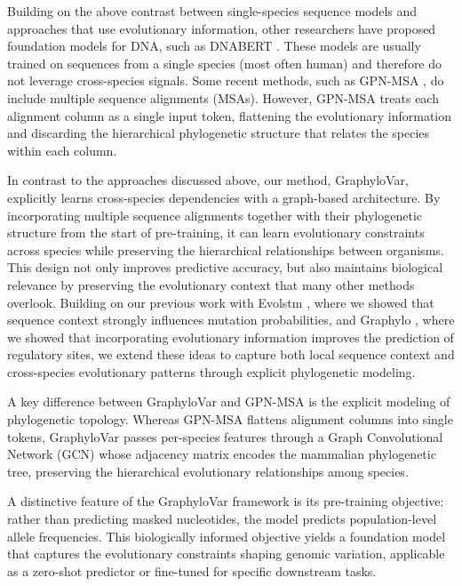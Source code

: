 \documentclass[unnumsec,webpdf,contemporary,large]{oup-authoring-template}%
\newcommand{\rev}[1]{{\color{red}#1}}
\theoremstyle{thmstyleone}%
\theoremstyle{thmstyletwo}%
\theoremstyle{thmstylethree}%
\begin{document}
Building on the above contrast between single-species sequence models and approaches that use evolutionary information, other researchers have proposed foundation models for DNA, such as DNABERT \citep{ji2021dnabert}. These models are usually trained on sequences from a single species (most often human) and therefore do not leverage cross-species signals. Some recent methods, such as \rev{GPN-MSA \citep{benegas2024gpnmsa}, do include multiple sequence alignments (MSAs). However, GPN-MSA treats each alignment column as a single input token, flattening the evolutionary information and discarding the hierarchical phylogenetic structure that relates the species within each column.}

In contrast to the approaches discussed above, our method, GraphyloVar, explicitly learns cross-species dependencies with a graph-based architecture. By incorporating multiple sequence alignments together with their phylogenetic structure from the start of pre-training, it can learn evolutionary constraints across species while preserving the hierarchical relationships between organisms. This design not only improves predictive accuracy, but also maintains biological relevance by preserving the evolutionary context that many other methods overlook. Building on our previous work with Evolstm \citep{lim2020evolstm}, where we showed that sequence context strongly influences mutation probabilities, and Graphylo \citep{lim2024graphylo}, where we showed that incorporating evolutionary information improves the prediction of regulatory sites, we extend these ideas to capture both local sequence context and cross-species evolutionary patterns through explicit phylogenetic modeling.

\rev{A key difference between GraphyloVar and GPN-MSA is the explicit modeling of phylogenetic topology. Whereas GPN-MSA flattens alignment columns into single tokens, GraphyloVar passes per-species features through a Graph Convolutional Network (GCN) whose adjacency matrix encodes the mammalian phylogenetic tree, preserving the hierarchical evolutionary relationships among species.}

A distinctive feature of the GraphyloVar framework is its pre-training objective: rather than predicting masked nucleotides, the model predicts population-level allele frequencies. This biologically informed objective yields a foundation model that captures the evolutionary constraints shaping genomic variation, applicable as a zero-shot predictor or fine-tuned for specific downstream tasks.
\end{document}
